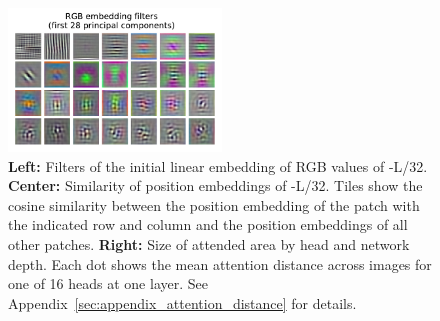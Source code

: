 \begin{figure}[t]
\vspace{3mm}
    \includegraphics[height=1.5in,trim={0.15in 0in 0in 0in},clip]{images/visualizations/20201002_rgb_filter_pca.pdf}
    \hfill
    \hfill
    \caption{
        \textbf{Left:} Filters of the initial linear embedding of RGB values of \oursabbrv-L/32.
        \textbf{Center:} Similarity of position embeddings of \oursabbrv-L/32. Tiles show the cosine similarity between the position embedding of the patch with the indicated row and column and the position embeddings of all other patches.
        \textbf{Right:} Size of attended area by head and network depth. Each dot shows the mean attention distance across images for one of 16 heads at one layer. See Appendix~\ref{sec:appendix_attention_distance} for details.}
    \label{fig:transformer_visualization}
    \vspace{5mm}
\end{figure}


